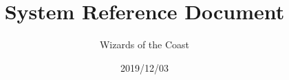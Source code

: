 \documentclass[letterpaper,twocolumn,openany]{dndbook}
\title{System Reference Document}
\author{Wizards of the Coast}
\date{2019/12/03}
\begin{document}
\frontmatter

\DndMakeCover%
\DndMakeSubcover%

\setcounter{tocdepth}{1}
{
  \hypersetup{hidelinks}
  \tableofcontents
}

\mainmatter%




%

\backmatter%
{\hypersetup{hidelinks}
	\printindex[index]
}

\renewcommand*{\DndBackcover}{img/backcoverimage}
\renewcommand{\DndBackcoverHeader}{System \protect\\ Reference \protect\\ Document}
\renewcommand{\DndBackcoverDescription}{The Systems Reference Document contains guidelines for publishing content under the Open-Gaming License.}
\renewcommand{\DndBackcoverClose}{The OGL and Dungeon Masters Guild offer different kinds of publishing opportunities.}
\renewcommand{\DndBackcoverLink}{\normalsize\url{https://dnd.wizards.com/articles/features/systems-reference-document-srd}}
\renewcommand*{\DndBackcoverLogo}{img/cover-logo-homebrewery}
\DndMakeBackcover%
\end{document}
